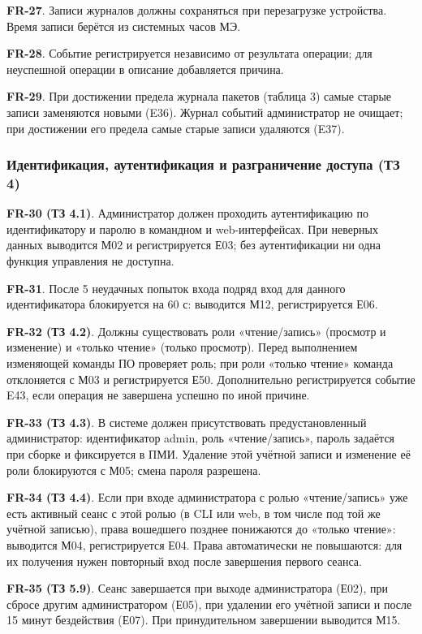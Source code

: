 \documentclass[13pt,a4paper,final]{article}
\begin{document}
	\textbf{FR-27}. Записи журналов должны сохраняться при перезагрузке устройства. Время записи берётся из системных часов МЭ.
	
	\textbf{FR-28}. Событие регистрируется независимо от результата операции; для неуспешной операции в описание добавляется причина.
	
	\textbf{FR-29}. При достижении предела журнала пакетов (таблица 3) самые старые записи заменяются новыми (E36). Журнал событий администратор не очищает; при достижении его предела самые старые записи удаляются (E37).
	
	\subsubsection{Идентификация, аутентификация и разграничение доступа (ТЗ 4)}
	
	\textbf{FR-30 (ТЗ 4.1)}. Администратор должен проходить аутентификацию по идентификатору и паролю в командном и web-интерфейсах. При неверных данных выводится М02 и регистрируется Е03; без аутентификации ни одна функция управления не доступна.
	
	\textbf{FR-31}. После 5 неудачных попыток входа подряд вход для данного идентификатора блокируется на 60 с: выводится М12, регистрируется Е06.
	
	\textbf{FR-32 (ТЗ 4.2)}. Должны существовать роли «чтение/запись» (просмотр и изменение) и «только чтение» (только просмотр). Перед выполнением изменяющей команды ПО проверяет роль; при роли «только чтение» команда отклоняется с М03 и регистрируется Е50. Дополнительно регистрируется событие E43, если операция не завершена успешно по иной причине.
	
	\textbf{FR-33 (ТЗ 4.3)}. В системе должен присутствовать предустановленный администратор: идентификатор admin, роль «чтение/запись», пароль задаётся при сборке и фиксируется в ПМИ. Удаление этой учётной записи и изменение её роли блокируются с М05; смена пароля разрешена.
	
	\textbf{FR-34 (ТЗ 4.4)}. Если при входе администратора с ролью «чтение/запись» уже есть активный сеанс с этой ролью (в CLI или web, в том числе под той же учётной записью), права вошедшего позднее понижаются до «только чтение»: выводится М04, регистрируется Е04. Права автоматически не повышаются: для их получения нужен повторный вход после завершения первого сеанса.
	
	\textbf{FR-35 (ТЗ 5.9)}. Сеанс завершается при выходе администратора (Е02), при сбросе другим администратором (Е05), при удалении его учётной записи и после 15 минут бездействия (Е07). При принудительном завершении выводится М15.
	
\end{document}
